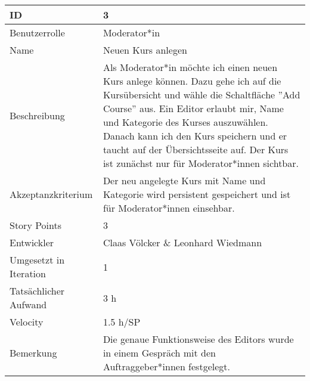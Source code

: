 \begin{tabularx}{\textwidth}{|p{}|X|}
	\hline
	ID & 3\\
	\hline
	Benutzerrolle & Moderator*in\\
	\hline
	Name & Neuen Kurs anlegen\\
	\hline
	Beschreibung & Als Moderator*in möchte ich einen neuen Kurs anlege können. Dazu gehe ich auf die Kursübersicht und wähle die Schaltfläche ''Add Course'' aus. Ein Editor erlaubt mir, Name und Kategorie des Kurses auszuwählen. Danach kann ich den Kurs speichern und er taucht auf der Übersichtsseite auf. Der Kurs ist zunächst nur für Moderator*innen sichtbar.
\\
	\hline
	Akzeptanzkriterium & Der neu angelegte Kurs mit Name und Kategorie wird persistent gespeichert und ist für Moderator*innen einsehbar.\\
	\hline
	Story Points & 3\\
	\hline
	Entwickler & Claas Völcker \& Leonhard Wiedmann\\
	\hline
	Umgesetzt in Iteration & 1\\
	\hline
	Tatsächlicher Aufwand & 3 h\\
	\hline
	Velocity & 1.5 h/SP\\
	\hline
	Bemerkung & Die genaue Funktionsweise des Editors wurde in einem Gespräch mit den Auftraggeber*innen festgelegt.\\
	\hline
\end{tabularx}
\vspace{20pt}
